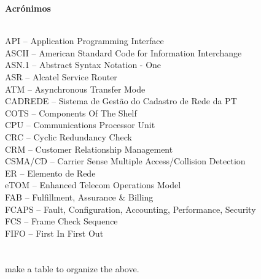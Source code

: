 \label{Acronym}
{\large{\textbf{Acrónimos}}}
\\
\\
\par
\begin{minipage}{\linewidth}
	API	–	Application Programming Interface \\
	ASCII	–	American Standard Code for Information Interchange \\
	ASN.1	–	Abstract Syntax Notation - One \\
	ASR	–	Alcatel Service Router \\
	ATM	–	Asynchronous Transfer Mode \\
	CADREDE	–	Sistema de Gestão do Cadastro de Rede da PT \\
	COTS	–	Components Of The Shelf \\
	CPU	–	Communications Processor Unit \\
	CRC	–	Cyclic Redundancy Check \\
	CRM	–	Customer Relationship Management \\
	CSMA/CD	–	Carrier Sense Multiple Access/Collision Detection \\
	ER	–	Elemento de Rede \\
	eTOM	–	Enhanced Telecom Operations Model \\
	FAB	–	Fulfillment, Assurance \& Billing \\
	FCAPS	–	Fault, Configuration, Accounting, Performance, Security \\
	FCS	–	Frame Check Sequence \\
	FIFO	–	First In First Out \\
	\\
	\\
	make a table to organize the above.
	\\
	
\end {minipage}
